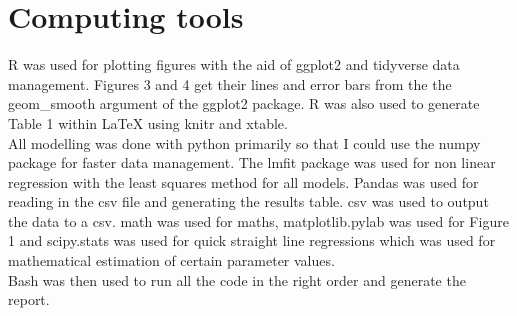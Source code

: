 \documentclass[fontsize=11pt]{scrartcl}\usepackage[]{graphicx}\usepackage[]{color}
\begin{document}
  \section{Computing tools}
  R was used for plotting figures with the aid of ggplot2 and tidyverse data management. Figures 3 and 4 get their lines and 
  error bars from the the geom\_smooth argument of the ggplot2 package.
  R was also used to generate Table 1 within LaTeX using knitr and xtable. \\
  All modelling was done with python primarily so that I could use the numpy package for faster data management.
   The lmfit package was used for non linear regression with the least 
  squares method for all models. Pandas was used for reading in the csv file and generating the results table. 
  csv was used to output the data to a csv. math was used for maths, matplotlib.pylab was used
  for Figure 1 and scipy.stats was used for quick straight line regressions which was used 
  for mathematical estimation of certain parameter values. \\
  Bash was then used to run all the code in the right order and generate the report.
\end{document}
